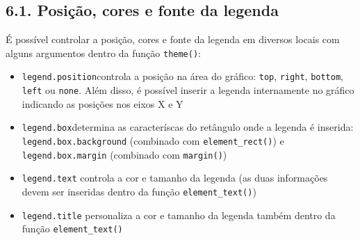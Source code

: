 \documentclass[
]{book}
\begin{document}
\hypertarget{posiuxe7uxe3o-cores-e-fonte-da-legenda}{%
\subsection{6.1. Posição, cores e fonte da legenda}\label{posiuxe7uxe3o-cores-e-fonte-da-legenda}}

É possível controlar a posição, cores e fonte da legenda em diversos locais com alguns argumentos dentro da função \texttt{theme()}:

\begin{itemize}
\item
  \texttt{legend.position}controla a posição na área do gráfico: \texttt{top}, \texttt{right}, \texttt{bottom}, \texttt{left} ou \texttt{none}. Além disso, é possível inserir a legenda internamente no gráfico indicando as posições nos eixos X e Y
\item
  \texttt{legend.box}determina as caracteríscas do retângulo onde a legenda é inserida: \texttt{legend.box.background} (combinado com \texttt{element\_rect()}) e \texttt{legend.box.margin} (combinado com \texttt{margin()})
\item
  \texttt{legend.text} controla a cor e tamanho da legenda (as duas informações devem ser inseridas dentro da função \texttt{element\_text()})
\item
  \texttt{legend.title} personaliza a cor e tamanho da legenda também dentro da função \texttt{element\_text()}
\end{itemize}
\end{document}
